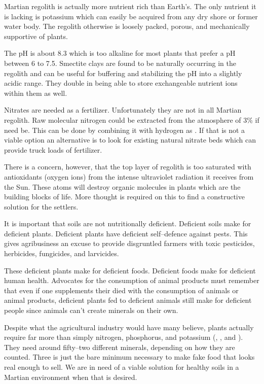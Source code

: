 Martian regolith is actually more nutrient rich than Earth's. The only nutrient it is lacking is potassium which can easily be acquired from any dry shore or former water body. The regolith otherwise is loosely packed, porous, and mechanically supportive of plants.

The pH is about 8.3 which is too alkaline for most plants that prefer a pH between 6 to 7.5. Smectite clays are found to be naturally occurring in the regolith and can be useful for buffering and stabilizing the pH into a slightly acidic range. They double in being able to store exchangeable nutrient ions within them as well.

Nitrates are needed as a fertilizer. Unfortunately they are not in all Martian regolith. Raw molecular nitrogen could be extracted from the atmosphere of 3\% if need be. This can be done by combining it with hydrogen as . If that is not a viable option an alternative is to look for existing natural nitrate beds which can provide truck loads of fertilizer.

There is a concern, however, that the top layer of regolith is too saturated with antioxidants (oxygen ions) from the intense ultraviolet radiation it receives from the Sun. These atoms will destroy organic molecules in plants which are the building blocks of life. More thought is required on this to find a constructive solution for the settlers.

It is important that soils are not nutritionally deficient. Deficient soils make for deficient plants. Deficient plants have deficient self--defence against pests. This gives agribusiness an excuse to provide disgruntled farmers with toxic pesticides, herbicides, fungicides, and larvicides. 

These deficient plants make for deficient foods. Deficient foods make for deficient human health. Advocates for the consumption of animal products must remember that even if one supplements their died with the consumption of animals or animal products, deficient plants fed to deficient animals still make for deficient people since animals can't create minerals on their own.

Despite what the agricultural industry would have many believe, plants actually require far more than simply nitrogen, phosphorus, and potassium (, , and ). They need around fifty--two different minerals, depending on how they are counted. Three is just the bare minimum necessary to make fake food that looks real enough to sell. We are in need of a viable solution for healthy soils in a Martian environment when that is desired.

